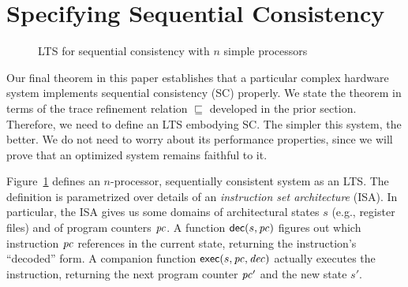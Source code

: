 \section{Specifying Sequential Consistency}\label{sec:sc}

\begin{figure}
\centering
\begin{boxedminipage}[c]{.48\textwidth}
{}
{}

{}

{}

{}
\end{boxedminipage}
\caption{LTS for sequential consistency with $n$ simple processors}
\label{Ref}
\end{figure}

Our final theorem in this paper establishes that a particular complex hardware
system implements sequential consistency (SC) properly.  We state the theorem
in terms of the trace refinement relation $\sqsubseteq$ developed in the prior
section.  Therefore, we need to define an LTS embodying SC.  The simpler this
system, the better.  We do not need to worry about its performance properties,
since we will prove that an optimized system remains faithful to it.

Figure~\ref{Ref} defines an $n$-processor, sequentially consistent system as an
LTS.  The definition is parametrized over details of an \emph{instruction set
architecture} (ISA).  In particular, the ISA gives us some domains of
architectural states $s$ (e.g., register files) and of program counters $\mathit{pc}$.
A function $\mathsf{dec}(s, \mathit{pc})$ figures out which instruction $\mathit{pc}$ references in the
current state, returning the instruction's ``decoded'' form.  A companion
function $\mathsf{exec}(s, \mathit{pc}, \mathit{dec})$ actually executes the instruction,
returning the next program counter $\mathit{pc}'$ and the new state $s'$.

